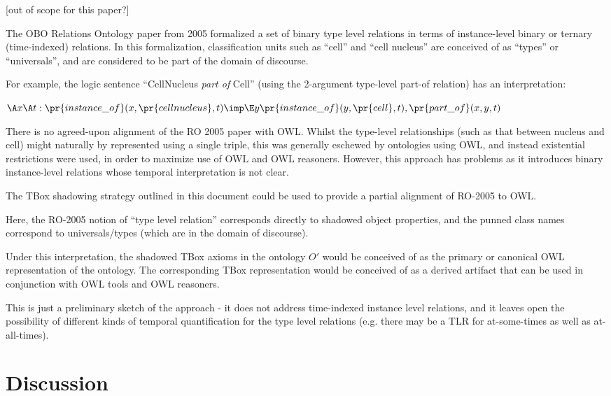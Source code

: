 \documentclass{my}
\def\partOf{\pr{part\_of}}
\def\instanceOf{\pr{instance\_of}}
\def\CellNucleus{\pr{cell nucleus}}
\def\Cell{\pr{cell}}
\begin{document}
[out of scope for this paper?]

The OBO Relations Ontology paper from 2005\cite{Smith2005} formalized
a set of binary type level relations in terms of instance-level binary
or ternary (time-indexed) relations. In this formalization,
classification units such as ``cell'' and ``cell nucleus'' are
conceived of as ``types'' or ``universals'', and are considered to be
part of the domain of discourse.

For example, the logic sentence ``CellNucleus \emph{part of} Cell''
(using the 2-argument type-level part-of relation) has an interpretation:

$
\A x \A t : \instanceOf(x, \CellNucleus, t) \imp \\
 \E y \instanceOf(y, \Cell, t), \partOf(x,y,t)
$

There is no agreed-upon alignment of the RO 2005 paper with
OWL. Whilst the type-level relationships (such as that between nucleus
and cell) might naturally by represented using a single triple, this
was generally eschewed by ontologies using OWL, and instead
existential restrictions were used\cite{golbreich2007obo}, in order to
maximize use of OWL and OWL reasoners. However, this approach has
problems as it introduces binary instance-level relations whose
temporal interpretation is not clear.

The TBox shadowing strategy outlined in this document could be used to
provide a partial alignment of RO-2005 to OWL.

Here, the RO-2005 notion of ``type level relation'' corresponds
directly to shadowed object properties, and the punned class names
correspond to universals/types (which are in the domain of
discourse).

Under this interpretation, the shadowed TBox axioms in the ontology
$O'$ would be conceived of as the primary or canonical OWL
representation of the ontology. The corresponding TBox representation
would be conceived of as a derived artifact that can be used in
conjunction with OWL tools and OWL reasoners.

This is just a preliminary sketch of the approach - it does not
address time-indexed instance level relations, and it leaves open the
possibility of different kinds of temporal quantification for the type
level relations (e.g. there may be a TLR for at-some-times as well as
at-all-times).

\section{Discussion}
\end{document}
